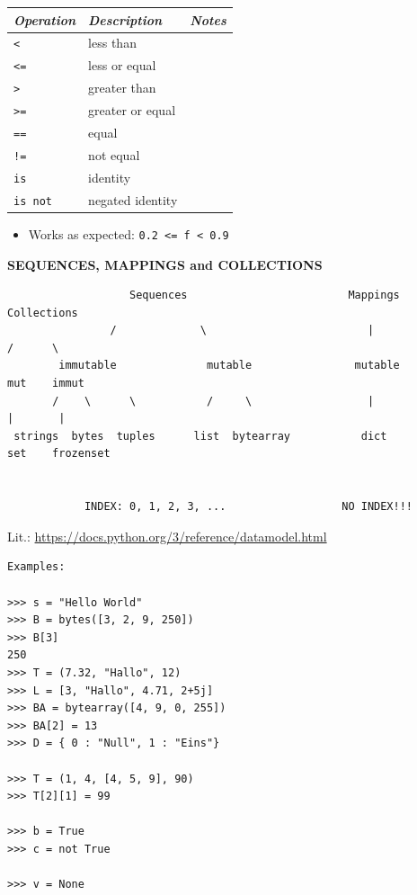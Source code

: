 \documentclass[9pt,a4wide]{extarticle}
\begin{document}
\begin{supertabular}{|l|p{12cm}|c|}\hline
{\em Operation}      & {\em Description}        &  {\em Notes} \\ \hline\hline

{\tt < }                   & less than                &        \\ \hline
{\tt <=}                   & less or equal            &        \\ \hline
{\tt > }                   & greater than             &        \\ \hline
{\tt >=}                   & greater or equal         &        \\ \hline
{\tt ==}                   & equal                    &        \\ \hline
{\tt !=}                   & not equal                &        \\ \hline
{\tt is}                   & identity                 &        \\ \hline
{\tt is not}               & negated identity         &        \\ \hline
\end{supertabular}

\medskip

\begin{itemize}
\item Works as expected: {\tt 0.2 <= f < 0.9}
\end{itemize}




\bigskip
{\LARGE\bf SEQUENCES, MAPPINGS and COLLECTIONS}

\begin{verbatim}
                   Sequences                         Mappings         Collections 
                /             \                         |               /      \
        immutable              mutable                mutable          mut    immut
       /    \      \           /     \                  |               |       |
 strings  bytes  tuples      list  bytearray           dict            set    frozenset


            INDEX: 0, 1, 2, 3, ...                  NO INDEX!!!
\end{verbatim}


Lit.: \url{https://docs.python.org/3/reference/datamodel.html}


\begin{verbatim}
Examples:

>>> s = "Hello World"
>>> B = bytes([3, 2, 9, 250])
>>> B[3]
250
>>> T = (7.32, "Hallo", 12)
>>> L = [3, "Hallo", 4.71, 2+5j]
>>> BA = bytearray([4, 9, 0, 255])
>>> BA[2] = 13
>>> D = { 0 : "Null", 1 : "Eins"}

>>> T = (1, 4, [4, 5, 9], 90)
>>> T[2][1] = 99

>>> b = True
>>> c = not True

>>> v = None
\end{verbatim}
\end{document}
